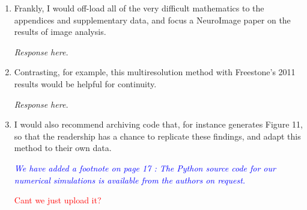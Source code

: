 \documentclass{article}
\newcommand{\dean}[1]{\textcolor{red}{#1}}
\newcommand{\parham}[1]{\textcolor{blue}{#1}}
\begin{document}
\begin{enumerate}
			\item Frankly, I would off-load all of the very difficult mathematics to the appendices and supplementary data, and focus a NeuroImage paper on the results of image analysis. 
			
			\emph{Response here.}
			
			\item Contrasting, for example, this multiresolution method with Freestone's 2011 results would be helpful for continuity.
			
			\emph{Response here.}
						
			
			\item I would also recommend archiving code that, for instance generates Figure 11, so that the readership has a chance to replicate these findings, and adapt this method to their own data.
			
 			\emph{\parham{We have added a footnote on page 17 : The Python source code for our numerical simulations is available from the authors on request.}}
 		
\dean{Cant we just upload it?}
			                                       
			\end{enumerate}  
\end{document}
